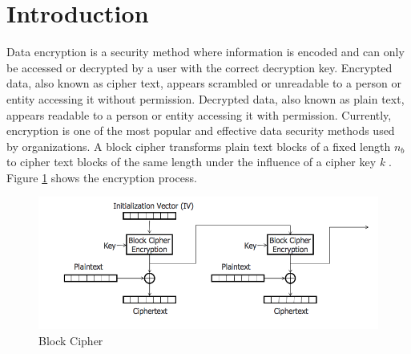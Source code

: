 \documentclass[journal]{IEEEtran}
\begin{document}
\section{\textbf{Introduction}}
Data encryption is a security method where information is encoded and can only be accessed or decrypted by a user with the correct decryption key. Encrypted data, also known as cipher text, appears scrambled or unreadable to a person or entity accessing it without permission. Decrypted data, also known as plain text, appears readable to a person or entity accessing it with permission. Currently, encryption is one of the most popular and effective data security methods used by organizations. A block cipher transforms plain text blocks of a fixed length \textit{${n_b}$} to cipher text blocks of the same length under the influence of a cipher key \textit{k} \cite{block_cipher}. Figure \ref{fig:block_cipher} shows the encryption process.

\newline
\begin{figure}[!hb]
    \centering
    \includegraphics[scale=.3]{block_cipher}
    \caption{Block Cipher}
    \label{fig:block_cipher}
\end{figure}
\end{document}
